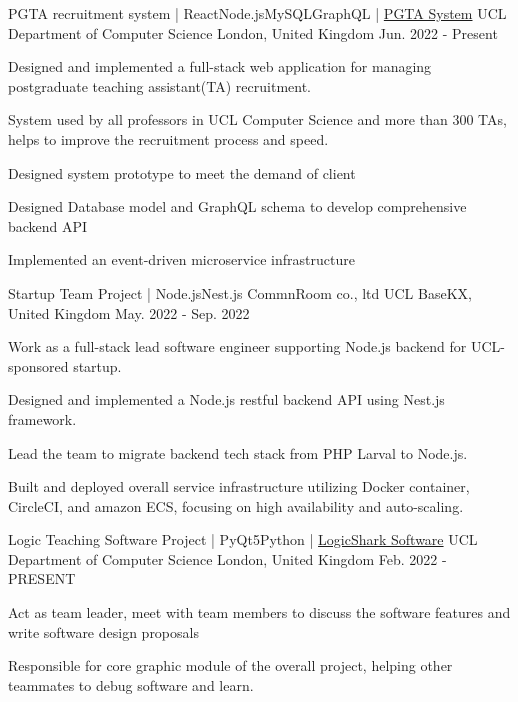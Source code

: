 \begin{cventries}
  \cventry
  {PGTA recruitment system  | React\acvHeaderIconSep\bullet\acvHeaderIconSep Node.js\acvHeaderIconSep\bullet\acvHeaderIconSep MySQL\acvHeaderIconSep\bullet\acvHeaderIconSep GraphQL | \href{https://ta.cs.ucl.ac.uk}{\faHome\acvHeaderIconSep PGTA System}}
  {UCL Department of Computer Science}
  {London, United Kingdom}
  {Jun. 2022 - Present}
  {
    \begin{cvitems}
      \item {Designed and implemented a full-stack web application for managing postgraduate teaching assistant(TA) recruitment.}
      \item {System used by all professors in UCL Computer Science and more than 300 TAs, helps to improve the recruitment process and speed.}
      \item {Designed system prototype to meet the demand of client}
      \item {Designed Database model and GraphQL schema to develop comprehensive backend API}
      \item {Implemented an event-driven microservice infrastructure}
    \end{cvitems}
  }

  \cventry
  {Startup Team Project | Node.js\acvHeaderIconSep\bullet\acvHeaderIconSep Nest.js}
  {CommnRoom co., ltd}
  {UCL BaseKX, United Kingdom}
  {May. 2022 - Sep. 2022}
  {
    \begin{cvitems}
      \item {Work as a full-stack lead software engineer supporting Node.js backend for UCL-sponsored startup.}
      \item {Designed and implemented a Node.js restful backend API using Nest.js framework.}
      \item {Lead the team to migrate backend tech stack from PHP Larval to Node.js.}
      \item {Built and deployed overall service infrastructure utilizing Docker container, CircleCI, and amazon ECS, focusing on high availability and auto-scaling.}
    \end{cvitems}
  }

  \cventry
    {Logic Teaching Software Project | PyQt5\acvHeaderIconSep\bullet\acvHeaderIconSep Python | \href{https://github.com/jerryyangboyu/LogicShark}{\faGithubSquare\acvHeaderIconSep LogicShark Software}}
    {UCL Department of Computer Science} %
    {London, United Kingdom} %
    {Feb. 2022 - PRESENT} %
    {
      \begin{cvitems} %
        \item {Act as team leader, meet with team members to discuss the software features and write software design proposals}
        \item {Responsible for core graphic module of the overall project, helping other teammates to debug software and learn.}
      \end{cvitems}
    }


\end{cventries}
